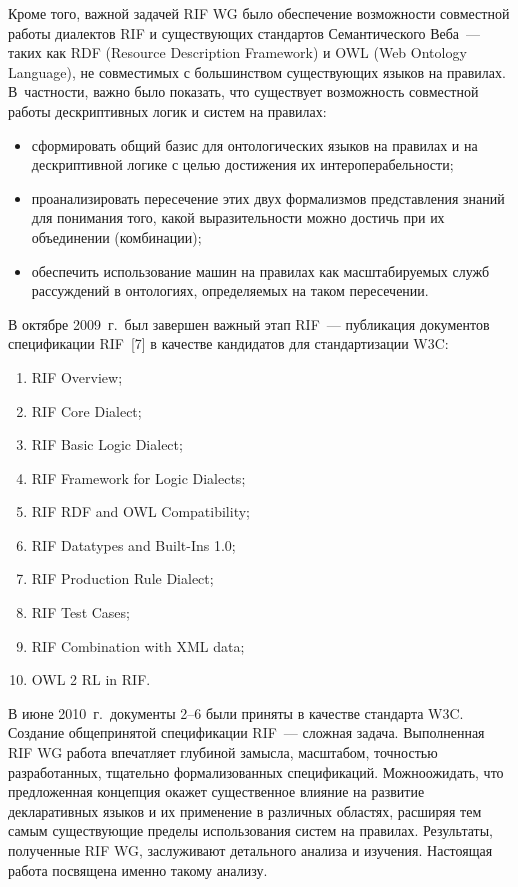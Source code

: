 \begin{multicols}{2}
Кроме того, важной задачей RIF WG было обеспечение возможности совместной работы 
диалектов RIF и существующих стандартов Семантического Веба~--- таких как RDF 
(Resource Description Framework) и OWL (Web Ontology Language), 
не совместимых с большинством существующих языков на правилах. В~част\-ности, важно 
было показать, что существует возможность совместной работы дескриптивных логик и 
систем на правилах:
\begin{itemize}
\item сформировать общий базис для онтологических языков на правилах и на дескриптивной логике с 
целью достижения их интероперабельности;
\item проанализировать пересечение этих двух формализмов представления знаний для понимания того, 
какой выразительности можно достичь при их объединении (комбинации);
\item обеспечить использование машин на правилах как масштабируемых служб рассуждений в онтологиях, 
определяемых на таком пересечении. 
\end{itemize}

В октябре 2009~г.\ был завершен важный этап RIF~--- публикация документов 
спецификации RIF~[7] в качестве кандидатов для стандартизации W3C:
\begin{enumerate}[(1)]
\item RIF Overview; 
\item RIF Core Dialect;
\item RIF Basic Logic Dialect;
\item RIF Framework for Logic Dialects;
\item RIF RDF and OWL Compatibility;
\item RIF Datatypes and Built-Ins 1.0;
\item RIF Production Rule Dialect;
\item RIF Test Cases;
\item RIF Combination with XML data;
\item OWL 2 RL in RIF.
\end{enumerate}

В июне 2010~г.\ документы 2--6 были приняты в качестве стандарта W3C. Создание 
общепринятой\linebreak
 спецификации RIF~--- сложная задача. Выполненная RIF WG работа 
впечатляет глубиной за\-мыс\-ла, масштабом, точностью разработанных, тщательно
формализованных спецификаций. \mbox{Можно}\linebreak ожидать, что предложенная концепция окажет 
существенное влияние на развитие декларативных языков и их применение в различных 
областях, расширяя тем самым существующие пределы использования систем на правилах. 
Результаты, полученные RIF WG, заслуживают детального анализа и изучения. Настоящая 
работа посвящена именно такому анализу. 


\end{multicols}
